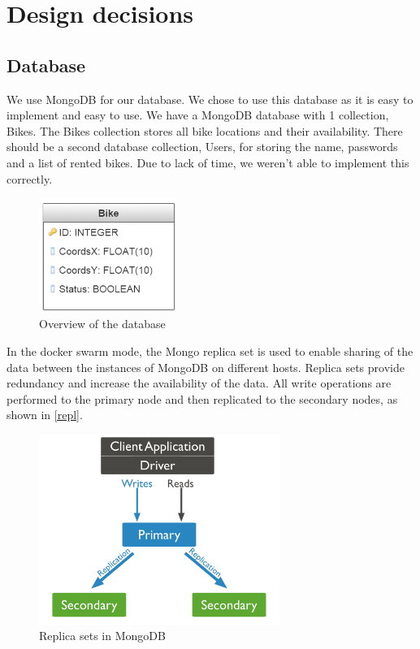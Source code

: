 \section{Design decisions}

\subsection{Database} \label{db_disc}
We use MongoDB for our database. We chose to use this database as it is easy to implement and easy to use. We have
a MongoDB database with 1 collection, Bikes. The Bikes collection stores all bike locations and their availability. There should be a second database collection, Users, for storing the name, passwords and a list of rented bikes. Due to lack of time, we weren't able to implement this correctly.

    \begin{figure}[H]
		\centering
		\includegraphics[width=0.4\textwidth]{images/db-structure.png}
		\caption{Overview of the database}
		\label{database}
	\end{figure}


In the docker swarm mode, the Mongo replica set is used to enable sharing of the data between the instances of MongoDB on different hosts. Replica sets provide redundancy and increase the availability of the data. All write operations are performed to the primary node and then replicated to the secondary nodes, as shown in \autoref{repl}.

    \begin{figure}[H]
		\centering
		\includegraphics[width=0.7\textwidth]{images/replication.png}
		\caption{Replica sets in MongoDB}
		\label{repl}
	\end{figure}


